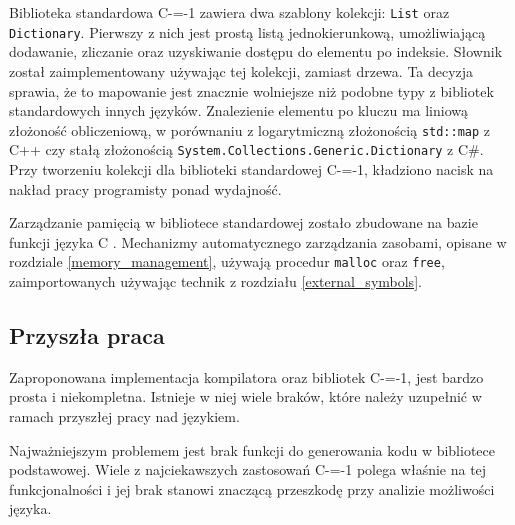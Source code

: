 Biblioteka standardowa C-=-1 zawiera dwa szablony kolekcji: \lstinline{List} oraz \lstinline{Dictionary}.
Pierwszy z nich jest prostą listą jednokierunkową, umożliwiającą dodawanie, zliczanie oraz uzyskiwanie dostępu do elementu po indeksie.
Słownik został zaimplementowany używając tej kolekcji, zamiast drzewa.
Ta decyzja sprawia, że to mapowanie jest znacznie wolniejsze niż podobne typy z bibliotek standardowych innych języków.
Znalezienie elementu po kluczu ma liniową złożoność obliczeniową, w porównaniu z logarytmiczną złożonością \lstinline{std::map} z C++ czy stałą złożonością \lstinline{System.Collections.Generic.Dictionary} z C\#.
Przy tworzeniu kolekcji dla biblioteki standardowej C-=-1, kładziono nacisk na nakład pracy programisty ponad wydajność.

Zarządzanie pamięcią w bibliotece standardowej zostało zbudowane na bazie funkcji języka C \cite{cLangStandard}.
Mechanizmy automatycznego zarządzania zasobami, opisane w rozdziale \ref{memory_management}, używają procedur \lstinline{malloc} oraz \lstinline{free}, zaimportowanych używając technik z rozdziału \ref{external_symbols}.

\subsection{Przyszła praca}

Zaproponowana implementacja kompilatora oraz bibliotek C-=-1, jest bardzo prosta i niekompletna.
Istnieje w niej wiele braków, które należy uzupełnić w ramach przyszłej pracy nad językiem.

Najważniejszym problemem jest brak funkcji do generowania kodu w bibliotece podstawowej.
Wiele z najciekawszych zastosowań C-=-1 polega właśnie na tej funkcjonalności i jej brak stanowi znaczącą przeszkodę przy analizie możliwości języka.
